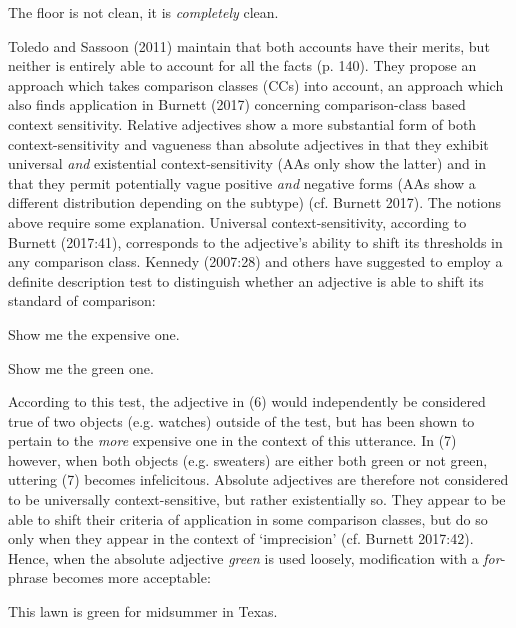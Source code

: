 \documentclass[output=paper
,modfonts
,nonflat]{langsci/langscibook}
\begin{document}
\begin{examples}
	\item The floor is not clean, it is \textit{completely} clean.
\end{examples}

Toledo and Sassoon (2011) maintain that both accounts have their merits, but neither is entirely able to account for all the facts (p. 140). They propose an approach which takes comparison classes (CCs) into account, an approach which also finds application in Burnett (2017) concerning comparison-class based context sensitivity.
Relative adjectives show a more substantial form of both context-sensitivity and vagueness than absolute adjectives in that they exhibit universal \textit{and} existential context-sensitivity (AAs only show the latter) and in that they permit potentially vague positive \textit{and} negative forms (AAs show a different distribution depending on the subtype) (cf. Burnett 2017). The notions above require some explanation. Universal context-sensitivity, according to Burnett (2017:41), corresponds to the adjective's ability to shift its thresholds in any comparison class. Kennedy (2007:28) and others have suggested to employ a definite description test to distinguish whether an adjective is able to shift its standard of comparison:

\begin{examples}
	\item Show me the expensive one.
	\item Show me the green one.
\end{examples}

According to this test, the adjective in (6) would independently be considered true of two objects (e.g. watches) outside of the test, but has been shown to pertain to the \textit{more} expensive one in the context of this utterance. In (7) however, when both objects (e.g. sweaters) are either both green or not green, uttering (7) becomes infelicitous. Absolute adjectives are therefore not considered to be universally context-sensitive, but rather existentially so. They appear to be able to shift their criteria of application in some comparison classes, but do so only when they appear in the context of `imprecision' (cf. Burnett 2017:42). Hence, when the absolute adjective \textit{green} is used loosely, modification with a \textit{for}-phrase becomes more acceptable:

\begin{examples}
	\item This lawn is green for midsummer in Texas.
\end{examples}
\end{document}
